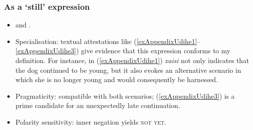 \subsubsection{As a \lq{}still\rq{ }expression}
\begin{itemize}
	\item \textcite[20, 438–440]{NikolaevaTolskaya2001} and \textcite[78]{Schneider1936}.
	\item Specialisation: textual attestations like (\ref{exAppendixUdihe1}–\ref{exAppendixUdihe3}) give evidence that this expression conforms to my definition. For instance, in (\ref{exAppendixUdihe1}) \textit{xaisi} not only indicates that the dog continued to be young, but it also evokes an alternative scenario in which she is no longer young and would consequently be harnessed.
	\item Pragmaticity: compatible with both scenarios; (\ref{exAppendixUdihe3}) is a prime candidate for an unexpectedly late continuation.  
	\item Polarity sensitivity: inner negation yields \textsc{not yet}.
\end{itemize}
